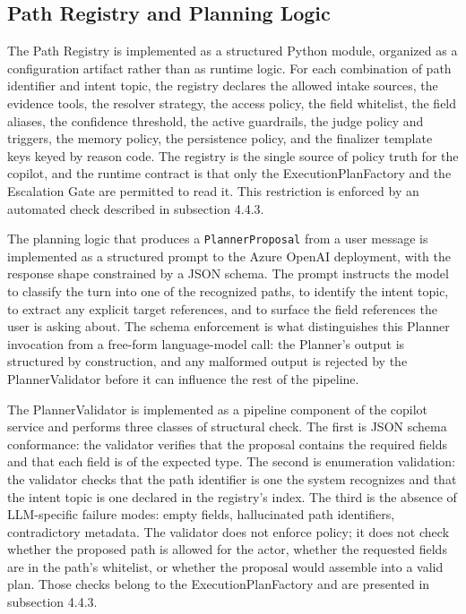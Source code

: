 \subsection{Path Registry and Planning Logic}
The Path Registry is implemented as a structured Python module, organized as a configuration artifact rather than as runtime logic. For each combination of path identifier and intent topic, the registry declares the allowed intake sources, the evidence tools, the resolver strategy, the access policy, the field whitelist, the field aliases, the confidence threshold, the active guardrails, the judge policy and triggers, the memory policy, the persistence policy, and the finalizer template keys keyed by reason code. The registry is the single source of policy truth for the copilot, and the runtime contract is that only the ExecutionPlanFactory and the Escalation Gate are permitted to read it. This restriction is enforced by an automated check described in subsection 4.4.3.

The planning logic that produces a \texttt{PlannerProposal} from a user message is implemented as a structured prompt to the Azure OpenAI deployment, with the response shape constrained by a JSON schema. The prompt instructs the model to classify the turn into one of the recognized paths, to identify the intent topic, to extract any explicit target references, and to surface the field references the user is asking about. The schema enforcement is what distinguishes this Planner invocation from a free-form language-model call: the Planner's output is structured by construction, and any malformed output is rejected by the PlannerValidator before it can influence the rest of the pipeline.

The PlannerValidator is implemented as a pipeline component of the copilot service and performs three classes of structural check. The first is JSON schema conformance: the validator verifies that the proposal contains the required fields and that each field is of the expected type. The second is enumeration validation: the validator checks that the path identifier is one the system recognizes and that the intent topic is one declared in the registry's index. The third is the absence of LLM-specific failure modes: empty fields, hallucinated path identifiers, contradictory metadata. The validator does not enforce policy; it does not check whether the proposed path is allowed for the actor, whether the requested fields are in the path's whitelist, or whether the proposal would assemble into a valid plan. Those checks belong to the ExecutionPlanFactory and are presented in subsection 4.4.3.

